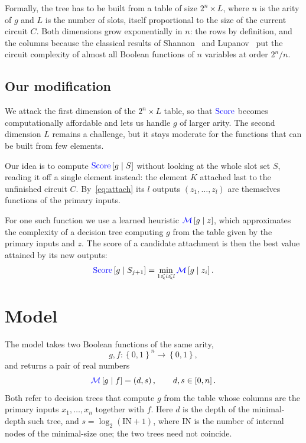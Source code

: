 \documentclass[11pt]{article}
\newcommand{\Score}{\textcolor{blue}{\mathrm{Score}}}
\newcommand{\MLM}{\textcolor{blue}{\mathcal{M}}}
\begin{document}
Formally, the tree has to be built from a table of size $2^n \times L$, where $n$ is the
arity of $g$ and $L$ is the number of slots, itself proportional to the size of the current
circuit $C$. Both dimensions grow exponentially in $n$: the rows by definition, and the
columns because the classical results of Shannon~\cite{shannon1949synthesis} and
Lupanov~\cite{lupanov1958synthesis} put the circuit complexity of almost all Boolean
functions of $n$ variables at order $2^n / n$.

\subsection{Our modification}

We attack the first dimension of the $2^n \times L$ table, so that $\Score$ becomes
computationally affordable and lets us handle $g$ of larger arity. The second dimension
$L$ remains a challenge, but it stays moderate for the functions that can be built from
few elements.

Our idea is to compute $\Score\left[g \mid S\right]$ without looking at the whole slot
set $S$, reading it off a single element instead: the element $K$ attached last to the
unfinished circuit $C$. By~\eqref{eq:attach} its $l$ outputs $\left(z_1, \dots, z_l\right)$
are themselves functions of the primary inputs.

For one such function we use a learned heuristic $\MLM\left[g \mid z\right]$, which
approximates the complexity of a decision tree computing $g$ from the table given by
the primary inputs and $z$. The score of a candidate attachment is then the best value
attained by its new outputs:
\begin{equation}
    \Score\left[g \mid S_{j+1}\right]
        = \min_{1 \leqslant i \leqslant l} \MLM\left[g \mid z_i\right].
\end{equation}

\section{Model}

The model takes two Boolean functions of the same arity,
$$
    g, f : \left\{0, 1\right\}^n \to \left\{0, 1\right\},
$$
and returns a pair of real numbers
$$
    \MLM\left[g \mid f\right] = \left(d, s\right), \qquad d, s \in \left[0, n\right].
$$
Both refer to decision trees that compute $g$ from the table whose columns are the
primary inputs $x_1, \dots, x_n$ together with $f$. Here $d$ is the depth of the
minimal-depth such tree, and $s = \log_2\left(\mathrm{IN} + 1\right)$, where
$\mathrm{IN}$ is the number of internal nodes of the minimal-size one; the two trees
need not coincide.
\end{document}

